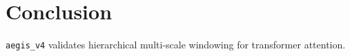 \section{Conclusion}\texttt{aegis\_v4} validates hierarchical multi-scale windowing for transformer attention.
